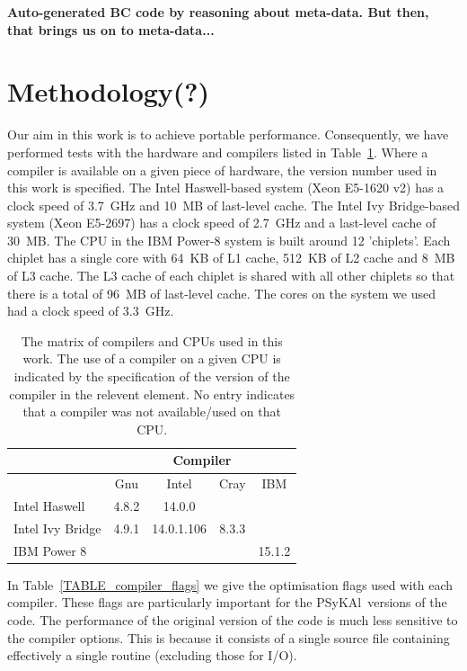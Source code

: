 \documentclass[journal]{IEEEtran}
\newcommand{\psykal}{{PS}y{KA}l\ }
\begin{document}
{\bf Auto-generated BC code by reasoning about meta-data. But then,
  that brings us on to meta-data...}

\section{Methodology(?)}

Our aim in this work is to achieve portable performance. Consequently,
we have performed tests with the hardware and compilers listed in
Table~\ref{TABLE_compilers}. Where a compiler is available on a given
piece of hardware, the version number used in this work is specified.
The Intel Haswell-based system (Xeon E5-1620 v2) has a clock speed of
3.7~GHz and 10~MB of last-level cache. The Intel Ivy Bridge-based
system (Xeon E5-2697) has a clock speed of 2.7~GHz and a last-level
cache of 30~MB. The CPU in the IBM Power-8 system is built around 12
'chiplets'. Each chiplet has a single core with 64~KB of L1 cache,
512~KB of L2 cache and 8~MB of L3 cache. The L3 cache of each chiplet
is shared with all other chiplets so that there is a total of 96~MB of
last-level cache. The cores on the system we used had a clock speed of
3.3~GHz.

\begin{table}[!t]
\renewcommand{\arraystretch}{1.3}
\caption{The matrix of compilers and CPUs used in this work. The use
  of a compiler on a given CPU is indicated by the specification of
  the version of the compiler in the relevent element. No entry
  indicates that a compiler was not available/used on that CPU.}
\label{TABLE_compilers}
\centering
\begin{tabular}{|l|c|c|c|c|}
\hline
                 & \multicolumn{4}{c|}{Compiler}             \\
\hline
                 & Gnu   & Intel       & Cray    & IBM     \\
\hline
Intel Haswell    & 4.8.2 & 14.0.0      &         &          \\
Intel Ivy Bridge & 4.9.1 & 14.0.1.106  & 8.3.3   &          \\
IBM Power 8      &       &             &         & 15.1.2     \\
\hline
\end{tabular}
\end{table}

In Table~\ref{TABLE_compiler_flags} we give the optimisation flags
used with each compiler. These flags are particularly important for
the \psykal versions of the code. The performance of the original
version of the code is much less sensitive to the compiler
options. This is because it consists of a single source file
containing effectively a single routine (excluding those for I/O).
 
\end{document}
